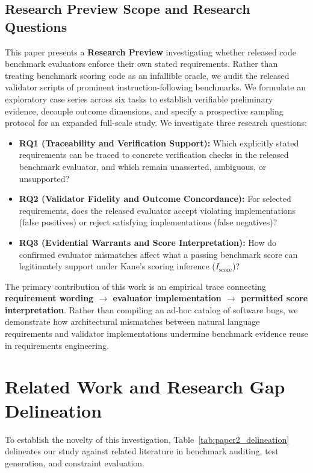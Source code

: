 \documentclass[runningheads]{llncs}
\begin{document}
\subsection{Research Preview Scope and Research Questions}
This paper presents a \textbf{Research Preview} investigating whether released code benchmark evaluators enforce their own stated requirements. Rather than treating benchmark scoring code as an infallible oracle, we audit the released validator scripts of prominent instruction-following benchmarks. We formulate an exploratory case series across six tasks to establish verifiable preliminary evidence, decouple outcome dimensions, and specify a prospective sampling protocol for an expanded full-scale study. We investigate three research questions:
\begin{itemize}[leftmargin=*]
    \item \textbf{RQ1 (Traceability and Verification Support):} Which explicitly stated requirements can be traced to concrete verification checks in the released benchmark evaluator, and which remain unasserted, ambiguous, or unsupported?
    \item \textbf{RQ2 (Validator Fidelity and Outcome Concordance):} For selected requirements, does the released evaluator accept violating implementations (false positives) or reject satisfying implementations (false negatives)?
    \item \textbf{RQ3 (Evidential Warrants and Score Interpretation):} How do confirmed evaluator mismatches affect what a passing benchmark score can legitimately support under Kane's scoring inference ($I_{\text{score}}$)?
\end{itemize}

The primary contribution of this work is an empirical trace connecting \textbf{requirement wording $\to$ evaluator implementation $\to$ permitted score interpretation}. Rather than compiling an ad-hoc catalog of software bugs, we demonstrate how architectural mismatches between natural language requirements and validator implementations undermine benchmark evidence reuse in requirements engineering.

\section{Related Work and Research Gap Delineation}
\label{sec:related_work}

To establish the novelty of this investigation, Table~\ref{tab:paper2_delineation} delineates our study against related literature in benchmark auditing, test generation, and constraint evaluation.
\end{document}
